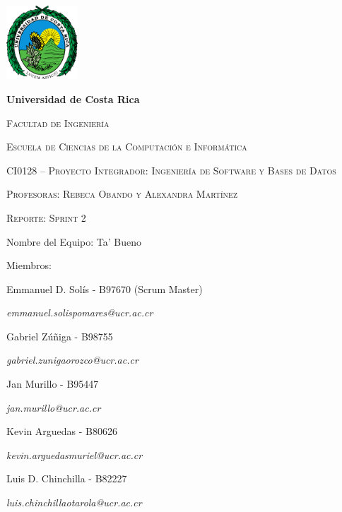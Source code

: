 \documentclass{article}
\begin{document}
\begin{titlepage}
\centering
{\includegraphics[width=0.2\textwidth]{logoUCR.png}\par}
\vspace{1cm}
{\bfseries\LARGE Universidad de Costa Rica \par}
\vspace{1cm}
{\scshape\Large Facultad de Ingenier\'ia \par}
{\scshape\Large Escuela de Ciencias de la Computaci\'on e Inform\'atica \par}
\vspace{1cm}
{\scshape\Large CI0128 – Proyecto Integrador: Ingeniería de Software y Bases de Datos \par}
{\scshape\Large Profesoras: Rebeca Obando y Alexandra Martínez \par}
\vspace{1cm}
{\scshape\Huge Reporte: Sprint 2 \par}
\vspace{1cm}
{\Large Nombre del Equipo: Ta' Bueno \par}
\vspace{0.5cm}
{\Large Miembros: \par}
{\Large Emmanuel D. Sol\'is - B97670 (Scrum Master)\par}
{\Large \textit{\color{blue}emmanuel.solispomares@ucr.ac.cr} \par}
{\Large Gabriel Zúñiga - B98755\par}
{\Large \textit{\color{blue}gabriel.zunigaorozco@ucr.ac.cr} \par}
{\Large Jan Murillo - B95447\par}
{\Large \textit{\color{blue}jan.murillo@ucr.ac.cr} \par}
{\Large Kevin Arguedas - B80626\par}
{\Large \textit{\color{blue}kevin.arguedasmuriel@ucr.ac.cr} \par}
{\Large Luis D. Chinchilla - B82227\par}
{\Large \textit{\color{blue}luis.chinchillaotarola@ucr.ac.cr} \par}
\end{titlepage}

\end{document}
